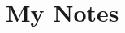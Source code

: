 \documentclass[11pt, a4paper]{article}
\begin{document}
\section*{My Notes}


%
%
%
%
\end{document}
